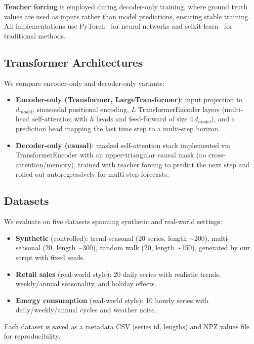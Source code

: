 \documentclass[11pt]{article}
\begin{document}
\textbf{Teacher forcing} is employed during decoder-only training, where ground truth values are used as inputs rather than model predictions, ensuring stable training. All implementations use PyTorch~\cite{paszke2019pytorch} for neural networks and scikit-learn~\cite{pedregosa2011scikit} for traditional methods.

\subsection{Transformer Architectures}

We compare encoder-only and decoder-only variants:
\begin{itemize}
    \item \textbf{Encoder-only (Transformer, LargeTransformer)}: input projection to $d_{model}$, sinusoidal positional encoding, $L$ TransformerEncoder layers (multi-head self-attention with $h$ heads and feed-forward of size $4\,d_{model}$), and a prediction head mapping the last time step to a multi-step horizon.
    \item \textbf{Decoder-only (causal)}: masked self-attention stack implemented via TransformerEncoder with an upper-triangular causal mask (no cross-attention/memory), trained with teacher forcing to predict the next step and rolled out autoregressively for multi-step forecasts.
\end{itemize}

\subsection{Datasets}

We evaluate on five datasets spanning synthetic and real-world settings:
\begin{itemize}
    \item \textbf{Synthetic} (controlled): trend-seasonal (20 series, length~\textasciitilde200), multi-seasonal (20, length~\textasciitilde300), random walk (20, length~\textasciitilde150), generated by our script with fixed seeds.
    \item \textbf{Retail sales} (real-world style): 20 daily series with realistic trends, weekly/annual seasonality, and holiday effects.
    \item \textbf{Energy consumption} (real-world style): 10 hourly series with daily/weekly/annual cycles and weather noise.
\end{itemize}

Each dataset is saved as a metadata CSV (series id, lengths) and NPZ values file for reproducibility.
\end{document}
